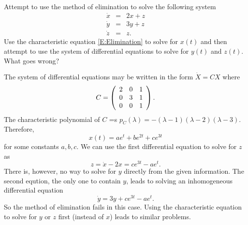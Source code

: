 \documentclass{ximera}
\begin{document}
\begin{exercise}  \label{c12.3.2}
Attempt to use the method of elimination to solve the following system
\[
\begin{array}{rcl}
\dot{x} & = & 2x + z\\
\dot{y} & = & 3y + z\\
\dot{z} & = & z.
\end{array}
\]
Use the characteristic equation \eqref{E:Elimination} to solve for $x(t)$ and 
then attempt to use the system of differential equations to solve for $y(t)$ 
and $z(t)$.  What goes wrong?

\begin{solution}

The system of differential equations may be written in the form $\dot{X}=CX$ where
\[
C=\left(\begin{array}{rrr} 2 & 0 & 1 \\ 0 & 3 & 1 \\ 0 & 0 & 1\end{array}\right).
\]
The characteristic polynomial of $C$ =s
$p_C(\lambda)=-(\lambda-1)(\lambda-2)(\lambda-3)$.  Therefore, 
\[
x(t) = ae^t+be^{2t}+ce^{3t}
\]
for some constants $a,b,c$.  We can use the first differential equation to solve for
$z$ as
\[
z = \dot{x}-2x = ce^{3t}-ae^t.
\]
There is, however, no way to solve for $y$ directly from the given information.  The
second eqution, the only one to contain $y$, leads to solving an inhomogeneous
differential equation
\[
\dot{y} = 3y + ce^{3t}-ae^t.
\]
So the method of elimination fails in this case.  Using the characteristic equation
to solve for $y$ or $z$ first (instead of $x$) leads to similar problems. 


\end{solution}
\end{exercise} 
\end{document}
